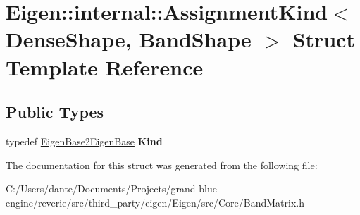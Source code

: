\hypertarget{struct_eigen_1_1internal_1_1_assignment_kind_3_01_dense_shape_00_01_band_shape_01_4}{}\section{Eigen\+::internal\+::Assignment\+Kind$<$ Dense\+Shape, Band\+Shape $>$ Struct Template Reference}
\label{struct_eigen_1_1internal_1_1_assignment_kind_3_01_dense_shape_00_01_band_shape_01_4}
\subsection*{Public Types}
\begin{DoxyCompactItemize}
\item 
\mbox{\label{struct_eigen_1_1internal_1_1_assignment_kind_3_01_dense_shape_00_01_band_shape_01_4_a487d348b92386835d76b9ecc5110a02a}} 
typedef \mbox{\hyperlink{struct_eigen_1_1internal_1_1_eigen_base2_eigen_base}{Eigen\+Base2\+Eigen\+Base}} {\bfseries Kind}
\end{DoxyCompactItemize}


The documentation for this struct was generated from the following file\+:\begin{DoxyCompactItemize}
\item 
C\+:/\+Users/dante/\+Documents/\+Projects/grand-\/blue-\/engine/reverie/src/third\+\_\+party/eigen/\+Eigen/src/\+Core/Band\+Matrix.\+h\end{DoxyCompactItemize}
